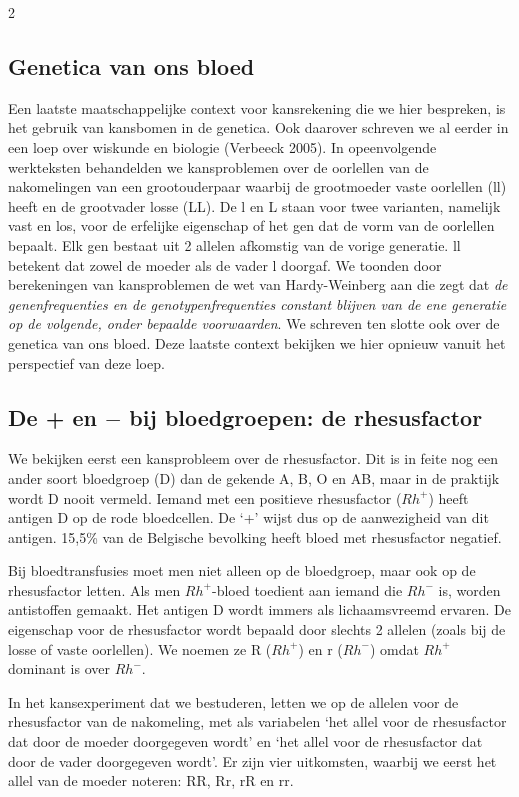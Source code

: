\begin{multicols}{2}
\subsection{Genetica van ons bloed}
Een laatste maatschappelijke context voor kansrekening die we hier bespreken, is het gebruik van kansbomen in de genetica. Ook daarover schreven we al eerder in een loep over wiskunde en biologie (Verbeeck 2005). In opeenvolgende werkteksten behandelden we kansproblemen over de oorlellen van de nakomelingen van een grootouderpaar waarbij de grootmoeder vaste oorlellen (ll) heeft en de grootvader losse (LL). De l en L staan voor twee varianten, namelijk vast en los, voor de erfelijke eigenschap of het gen dat de vorm van de oorlellen bepaalt. Elk gen bestaat uit 2 allelen afkomstig van de vorige generatie. ll betekent dat zowel de moeder als de vader l doorgaf. We toonden door berekeningen van kansproblemen de wet van Hardy-Weinberg aan die zegt dat \textit{de genenfrequenties en de genotypenfrequenties constant blijven van de ene generatie op de volgende, onder bepaalde voorwaarden}. We schreven ten slotte ook over de genetica van ons bloed. Deze laatste context bekijken we hier opnieuw vanuit het perspectief van deze loep.
\subsection*{De + en $-$ bij bloedgroepen: de rhesusfactor}
We bekijken eerst een kansprobleem over de rhesusfactor. Dit is in feite nog een ander soort bloedgroep (D) dan de gekende A, B, O en AB, maar in de praktijk wordt D nooit vermeld. Iemand met een positieve rhesusfactor ($Rh^+$) heeft antigen D op de rode bloedcellen. De ‘+’ wijst dus op de aanwezigheid van dit antigen. 15,5\% van de Belgische bevolking heeft bloed met rhesusfactor negatief.

Bij bloedtransfusies moet men niet alleen op de bloedgroep, maar ook op de rhesusfactor letten. Als men $Rh^+$-bloed toedient aan iemand die $Rh^-$ is, worden antistoffen gemaakt. Het antigen D wordt immers als lichaamsvreemd ervaren. De eigenschap voor de rhesusfactor wordt bepaald door slechts 2 allelen (zoals bij de losse of vaste oorlellen). We noemen ze R ($Rh^+$) en r ($Rh^-$) omdat $Rh^+$ dominant is over $Rh^-$. 

In het kansexperiment dat we bestuderen, letten we op de allelen voor de rhesusfactor van de nakomeling, met als variabelen ‘het allel voor de rhesusfactor dat door de moeder doorgegeven wordt’ en ‘het allel voor de rhesusfactor dat door de vader doorgegeven wordt’. Er zijn vier uitkomsten, waarbij we eerst het allel van de moeder noteren: RR, Rr, rR en rr. 


\end{multicols}
